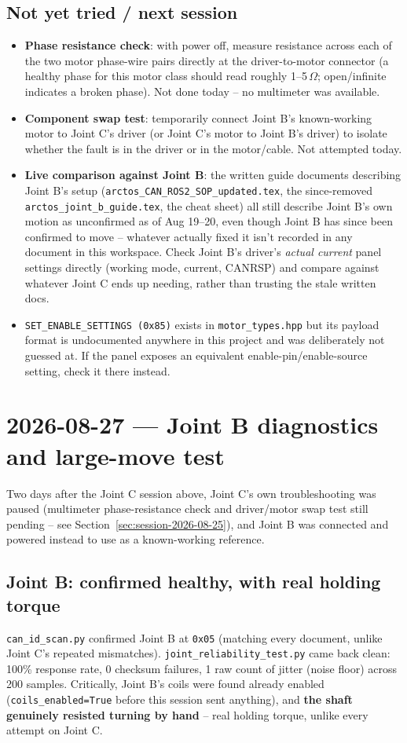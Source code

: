 \documentclass[11pt,letterpaper]{article}
\begin{document}
\subsection{Not yet tried / next session}
\begin{itemize}
    \item \textbf{Phase resistance check}: with power off, measure resistance across each of the two motor phase-wire pairs directly at the driver-to-motor connector (a healthy phase for this motor class should read roughly 1--5\,$\Omega$; open/infinite indicates a broken phase). Not done today -- no multimeter was available.
    \item \textbf{Component swap test}: temporarily connect Joint B's known-working motor to Joint C's driver (or Joint C's motor to Joint B's driver) to isolate whether the fault is in the driver or in the motor/cable. Not attempted today.
    \item \textbf{Live comparison against Joint B}: the written guide documents describing Joint B's setup (\texttt{arctos\_CAN\_ROS2\_SOP\_updated.tex}, the since-removed \texttt{arctos\_joint\_b\_guide.tex}, the cheat sheet) all still describe Joint B's own motion as unconfirmed as of Aug 19--20, even though Joint B has since been confirmed to move -- whatever actually fixed it isn't recorded in any document in this workspace. Check Joint B's driver's \emph{actual current} panel settings directly (working mode, current, CANRSP) and compare against whatever Joint C ends up needing, rather than trusting the stale written docs.
    \item \texttt{SET\_ENABLE\_SETTINGS (0x85)} exists in \texttt{motor\_types.hpp} but its payload format is undocumented anywhere in this project and was deliberately not guessed at. If the panel exposes an equivalent enable-pin/enable-source setting, check it there instead.
\end{itemize}

\section{2026-08-27 --- Joint B diagnostics and large-move test}
\label{sec:session-2026-08-27}
Two days after the Joint C session above, Joint C's own troubleshooting was paused (multimeter phase-resistance check and driver/motor swap test still pending -- see Section~\ref{sec:session-2026-08-25}), and Joint B was connected and powered instead to use as a known-working reference.

\subsection{Joint B: confirmed healthy, with real holding torque}
\texttt{can\_id\_scan.py} confirmed Joint B at \texttt{0x05} (matching every document, unlike Joint C's repeated mismatches). \texttt{joint\_reliability\_test.py} came back clean: 100\% response rate, 0 checksum failures, 1 raw count of jitter (noise floor) across 200 samples. Critically, Joint B's coils were found already enabled (\texttt{coils\_enabled=True} before this session sent anything), and \textbf{the shaft genuinely resisted turning by hand} -- real holding torque, unlike every attempt on Joint C.
\end{document}
